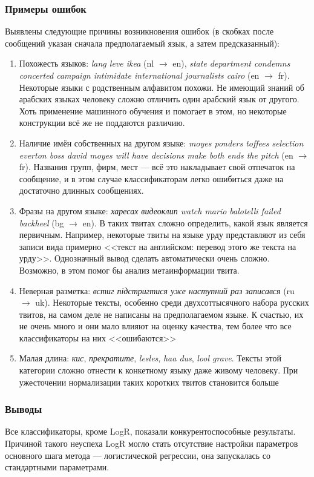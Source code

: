 \documentclass[a4paper, 14pt]{article}
\begin{document}
		\subsubsection{Примеры ошибок}
		Выявлены следующие причины возникновения ошибок (в скобках после сообщений указан сначала предполагаемый язык, а затем предсказанный):
		\begin{enumerate}
			\item Похожесть языков: \textit{lang leve ikea} (nl $\to$ en), 
				\textit{state department condemns concerted campaign intimidate international journalists cairo} (en $\to$ fr).
				Некоторые языки с родственным алфавитом похожи. Не имеющий знаний об арабских языках
				 человеку сложно отличить один арабский язык от другого. Хоть применение
				машинного обучения и помогает в этом, но некоторые конструкции всё же не поддаются различию.
			\item Наличие имён собственных на другом языке:
				\textit{moyes ponders toffees selection everton boss david moyes will have decisions make both ends the pitch} (en $\to$ fr).
				Названия групп, фирм, мест --- всё это накладывает свой отпечаток на сообщение, и в этом случае классификаторам
				легко ошибиться даже на достаточно длинных сообщениях.
			\item Фразы на другом языке:
				\textit{харесах видеоклип watch mario balotelli failed backheel} (bg $\to$ en). В таких твитах сложно определить, какой
				язык является первичным. Например, некоторые твиты на языке урду представляют из себя записи вида примерно 
				<<текст на английском: перевод этого же текста на урду>>. Однозначный вывод сделать автоматически очень сложно. Возможно, в этом
				помог бы анализ метаинформации твита.
			\item Неверная разметка: 
				\textit{встиг підстригтися уже наступний раз записався} (ru $\to$ uk). Некоторые тексты, особенно среди двухсоттысячного набора 
				русских твитов, на самом деле не написаны на предполагаемом языке. К счастью, их не очень много и они мало влияют на оценку
				качества, тем более что все классификаторы на них <<ошибаются>>
			\item Малая длина:
				\textit{кис}, \textit{прекратите}, \textit{lesles}, \textit{haa dus}, \textit{lool grave}. Тексты этой категории сложно отнести
				к конкетному языку даже живому человеку. При ужесточении нормализации таких коротких твитов становится больше
		\end{enumerate}
	
		\subsubsection{Выводы}
		Все классификаторы, кроме LogR, показали конкурентоспособные результаты. Причиной такого неуспеха LogR могло стать отсутствие настройки параметров основного шага метода --- логистической регрессии, она запускалась со стандартными параметрами.
		
\end{document}
